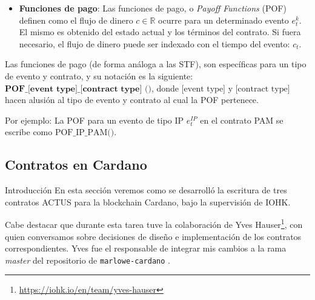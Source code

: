 \documentclass{beamer}
\begin{document}
\begin{frame}
    \begin{itemize}
        \item \textbf{Funciones de pago}: Las funciones de pago, o \textit{Payoff Functions} (POF) definen como el flujo de dinero $c \in\mathbb{R}$ ocurre para un determinado evento $e^k_t$. El mismo es obtenido del estado actual y los términos del contrato. Si fuera necesario, el flujo de dinero puede ser indexado con el tiempo del evento: $c_t$.
    \end{itemize}
    \pause
    \vfill
    Las funciones de pago (de forma análoga a las STF), son específicas para un tipo de evento y contrato, y su notación es la siguiente: $\textbf{POF\_[event type]\_[contract type] ()}$, donde $\text{[event type]}$ y $\text{[contract type]}$ hacen alusión al tipo de evento y contrato al cual la POF pertenece.
    \medskip
    \pause

    Por ejemplo: La POF para un evento de tipo IP $e^{IP}_t$ en el contrato PAM se escribe como $\text{POF\_IP\_PAM()}$.

\end{frame}

\subsection{Contratos en Cardano}

\begin{frame}{Introducción}
En esta sección veremos como se desarrolló la escritura de tres contratos ACTUS para la blockchain Cardano, bajo la supervisión de IOHK.\@

\vfill

Cabe destacar que durante esta tarea tuve la colaboración de Yves Hauser\footnote{\url{https://iohk.io/en/team/yves-hauser}}, con quien conversamos sobre decisiones de diseño e implementación de los contratos correspondientes. Yves fue el responsable de integrar mis cambios a la rama \textit{master} del repositorio de \texttt{marlowe-cardano} \cite{marlowe-cardano-github}. %


\end{frame}
\end{document}
